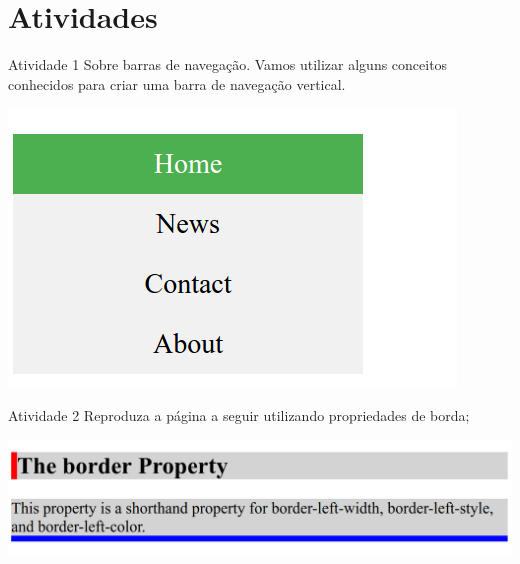 \documentclass{beamer}
\begin{document}
\section{Atividades}
\begin{frame}{Atividade 1}
Sobre barras de navegação. Vamos utilizar alguns conceitos conhecidos para criar uma barra de navegação 
vertical.
	\begin{center}
		  \includegraphics[height=0.4\paperheight]{aep_1_2.png} \\
	  \end{center}
\end{frame}
\begin{frame}{Atividade 2}
Reproduza a página a seguir utilizando propriedades de borda;
  \begin{center}
    \includegraphics[height=0.2\paperheight]{AEP_1_1.png} \\
  \end{center}
\end{frame}
\end{document}
